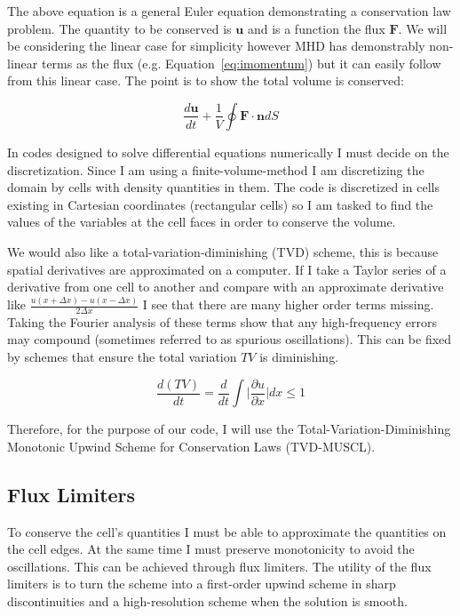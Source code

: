 \documentclass[12pt,upcase]{umlthesis}
\begin{document}
The above equation is a general Euler equation demonstrating a conservation law problem. The quantity to be conserved is $\textbf{u}$ and is a function the flux $\textbf{F}$. We will be considering the linear case for simplicity however MHD has demonstrably non-linear terms as the flux (e.g. Equation~\ref{eq:imomentum}) but it can easily follow from this linear case. The point is to show the total volume is conserved:

\begin{equation}\label{eq:geneulerint}
	\frac{d\textbf{u}}{dt} + \frac{1}{V} \oint \textbf{F} \cdot \textbf{n} dS
\end{equation}

In codes designed to solve differential equations numerically I must decide on the discretization. Since I am using a finite-volume-method I am discretizing the domain by cells with density quantities in them. The code is discretized in cells existing in Cartesian coordinates (rectangular cells) so I am tasked to find the values of the variables at the cell faces in order to conserve the volume.

We would also like a total-variation-diminishing (TVD) scheme, this is because spatial derivatives are approximated on a computer. If I take a Taylor series of a derivative from one cell to another and compare with an approximate derivative like $\frac{u(x+\Delta x)-u(x-\Delta x)}{2\Delta x}$ I see that there are many higher order terms missing. Taking the Fourier analysis of these terms show that any high-frequency errors may compound (sometimes referred to as spurious oscillations). This can be fixed by schemes that ensure the total variation $TV$ is diminishing.

\begin{equation}\label{eq:tvd}
	\frac{d(TV)}{dt} = \frac{d}{dt} \int \lvert \frac{\partial u}{\partial x} \rvert dx \leq 1
\end{equation}

Therefore, for the purpose of our code, I will use the Total-Variation-Diminishing Monotonic Upwind Scheme for Conservation Laws (TVD-MUSCL).

\subsection{Flux Limiters}\label{sec:fluxlimiters}

To conserve the cell's quantities I must be able to approximate the quantities on the cell edges. At the same time I must preserve monotonicity to avoid the oscillations. This can be achieved through flux limiters. The utility of the flux limiters is to turn the scheme into a first-order upwind scheme in sharp discontinuities and a high-resolution scheme when the solution is smooth.
\end{document}
